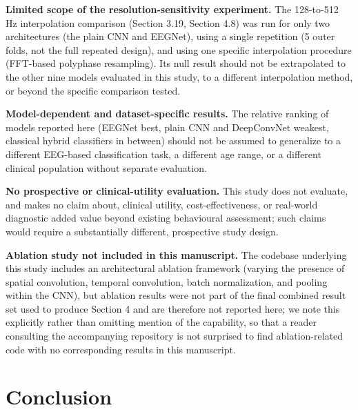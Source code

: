 \documentclass[a4paper,fleqn]{cas-sc}
\begin{document}
\textbf{Limited scope of the resolution-sensitivity experiment.} The 128-to-512 Hz interpolation comparison (Section 3.19, Section 4.8) was run for only two architectures (the plain CNN and EEGNet), using a single repetition (5 outer folds, not the full repeated design), and using one specific interpolation procedure (FFT-based polyphase resampling). Its null result should not be extrapolated to the other nine models evaluated in this study, to a different interpolation method, or beyond the specific comparison tested.



\textbf{Model-dependent and dataset-specific results.} The relative ranking of models reported here (EEGNet best, plain CNN and DeepConvNet weakest, classical hybrid classifiers in between) should not be assumed to generalize to a different EEG-based classification task, a different age range, or a different clinical population without separate evaluation.



\textbf{No prospective or clinical-utility evaluation.} This study does not evaluate, and makes no claim about, clinical utility, cost-effectiveness, or real-world diagnostic added value beyond existing behavioural assessment; such claims would require a substantially different, prospective study design.



\textbf{Ablation study not included in this manuscript.} The codebase underlying this study includes an architectural ablation framework (varying the presence of spatial convolution, temporal convolution, batch normalization, and pooling within the CNN), but ablation results were not part of the final combined result set used to produce Section 4 and are therefore not reported here; we note this explicitly rather than omitting mention of the capability, so that a reader consulting the accompanying repository is not surprised to find ablation-related code with no corresponding results in this manuscript.



\section{Conclusion}
\end{document}
